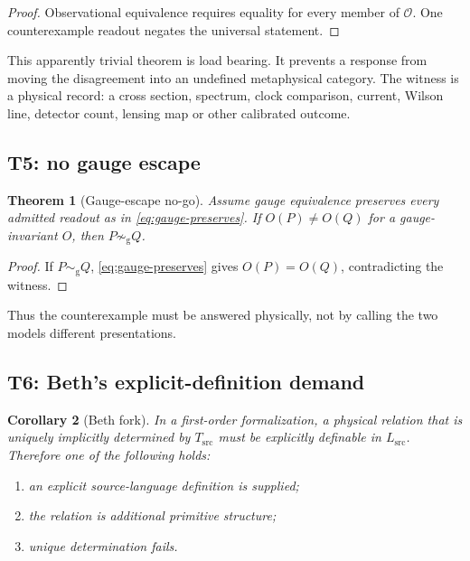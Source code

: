 \documentclass[10pt,a4paper]{article}
\newtheorem{theorem}{Theorem}[section]
\newtheorem{corollary}[theorem]{Corollary}
\theoremstyle{definition}
\theoremstyle{remark}
\newcommand{\Lsrc}{L_{\mathrm{src}}}
\newcommand{\Tsrc}{T_{\mathrm{src}}}
\newcommand{\Obs}{\mathcal O}
\newcommand{\gaugesim}{\sim_{\mathrm g}}
\begin{document}
\begin{proof}
Observational equivalence requires equality for every member of \(\Obs\).
One counterexample readout negates the universal statement.
\end{proof}

This apparently trivial theorem is load bearing.  It prevents a response from
moving the disagreement into an undefined metaphysical category.  The witness
is a physical record: a cross section, spectrum, clock comparison, current,
Wilson line, detector count, lensing map or other calibrated outcome.

\subsection{T5: no gauge escape}

\begin{theorem}[Gauge-escape no-go]
Assume gauge equivalence preserves every admitted readout as in
\cref{eq:gauge-preserves}.  If \(O(P)\neq O(Q)\) for a gauge-invariant
\(O\), then \(P\not\gaugesim Q\).
\end{theorem}

\begin{proof}
If \(P\gaugesim Q\), \cref{eq:gauge-preserves} gives \(O(P)=O(Q)\),
contradicting the witness.
\end{proof}

Thus the counterexample must be answered physically, not by calling the two
models different presentations.

\subsection{T6: Beth's explicit-definition demand}

\begin{corollary}[Beth fork]
\label{cor:bethfork}
In a first-order formalization, a physical relation that is uniquely implicitly
determined by \(\Tsrc\) must be explicitly definable in \(\Lsrc\).  Therefore
one of the following holds:
\begin{enumerate}[label=(\roman*)]
\item an explicit source-language definition is supplied;
\item the relation is additional primitive structure;
\item unique determination fails.
\end{enumerate}
\end{corollary}
\end{document}
